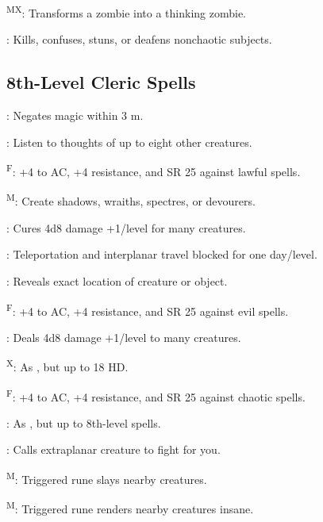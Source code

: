 \textsuperscript{MX}: Transforms a zombie into a thinking zombie. %

: Kills, confuses, stuns, or deafens nonchaotic subjects.



\subsection{8th-Level Cleric Spells}

: Negates magic within 3 m.

: Listen to thoughts of up to eight other creatures.

\textsuperscript{F}: +4 to AC, +4 resistance, and SR 25 against lawful spells.

\textsuperscript{M}: Create shadows, wraiths, spectres, or devourers.

: Cures 4d8 damage +1/level for many creatures.

: Teleportation and interplanar travel blocked for one day/level.

: Reveals exact location of creature or object.



\textsuperscript{F}: +4 to AC, +4 resistance, and SR 25 against evil spells.

: Deals 4d8 damage +1/level to many creatures.

\textsuperscript{X}: As , but up to 18 HD.

\textsuperscript{F}: +4 to AC, +4 resistance, and SR 25 against chaotic spells.

: As , but up to 8th-level spells.

: Calls extraplanar creature to fight for you.

\textsuperscript{M}: Triggered rune slays nearby creatures.

\textsuperscript{M}: Triggered rune renders nearby creatures insane.

